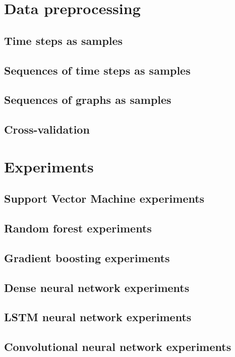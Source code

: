 \section{Data preprocessing} \label{sec: data_preprocessing}

\subsection{Time steps as samples}
\subsection{Sequences of time steps as samples}
\subsection{Sequences of graphs as samples}
\subsection{Cross-validation}


\section{Experiments} \label{sec: experiments}

\subsection{Support Vector Machine experiments}
\subsection{Random forest experiments}
\subsection{Gradient boosting experiments}
\subsection{Dense neural network experiments}
\subsection{LSTM neural network experiments}
\subsection{Convolutional neural network experiments}
